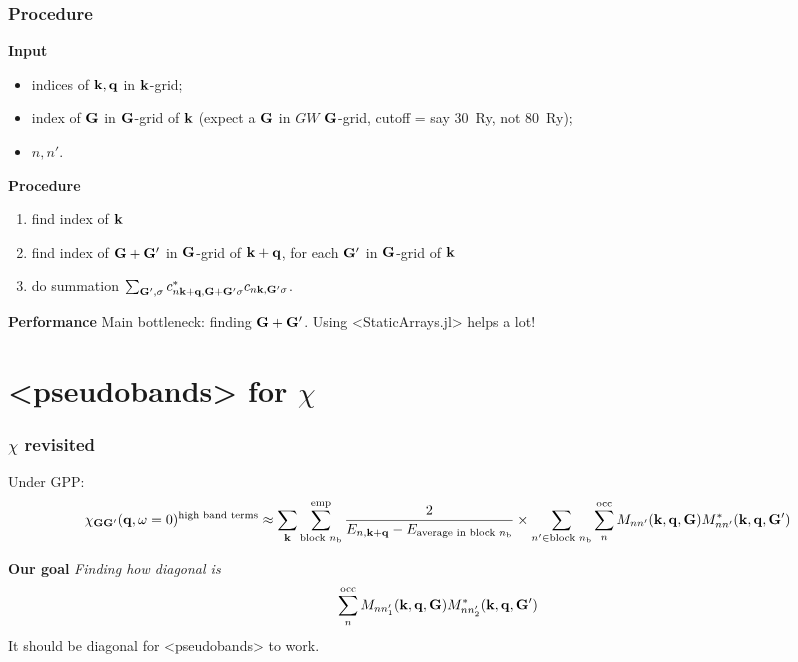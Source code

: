 \documentclass[t,aspectratio=169]{beamer}
\newcommand{\shortcode}[1]{\texttt{#1}}
\def\\{}%
\def\texttt#1{<#1>}%
\begin{document}
\begin{frame}
\frametitle{Procedure}

\textbf{Input} 
\begin{itemize}
    \item indices of $\vb{k}, \vb{q}$ in $\vb{k}$-grid; 
    \item index of $\vb{G}$ in $\vb{G}$-grid of $\vb{k}$ 
    (expect a $\vb{G}$ in $GW$ $\vb{G}$-grid, 
    cutoff = say \SI{30}{Ry}, not \SI{80}{Ry});
    \item $n, n'$.
\end{itemize}

\textbf{Procedure}
\begin{enumerate}
    \item find index of $\vb{k}$
    \item find index of $\vb{G} + \vb{G}'$ in $\vb{G}$-grid of $\vb{k} + \vb{q}$,
    for each $\vb{G}'$ in $\vb{G}$-grid of $\vb{k}$
    \item do summation $\sum_{\vb{G}', \sigma} c^*_{n \vb{k} + \vb{q}, \vb{G} + \vb{G}' \sigma} c_{n \vb{k}, \vb{G}' \sigma}$.
\end{enumerate}    

\vspace{0.3cm}

\textbf{Performance} Main bottleneck: finding $\vb{G} + \vb{G}'$.
Using \shortcode{StaticArrays.jl} helps a lot! 

\end{frame}

\section{\shortcode{pseudobands} for $\chi$}

\begin{frame}
\frametitle{$\chi$ revisited}

Under GPP:
\begin{equation*}
    \begin{aligned}
        \chi_{\vb{G} \vb{G}'}(\vb{q}, \omega=0)^{\text{high band terms}}
        \approx \sum_{\vb{k}} \sum_{\text{block $n_{\text{b}}$}}^{\text{emp}} 
        \frac{
            2
        }{
            E_{n, \vb{k} + \vb{q}} - E_{\text{average in block $n_{\text{b}}$}} 
        } \\
        \times \sum_{n' \in \text{block $n_{\text{b}}$}} \sum_{n}^{\text{occ}} 
        M_{n n'} (\vb{k}, \vb{q}, \vb{G}) M^*_{nn'} (\vb{k}, \vb{q}, \vb{G}') 
    \end{aligned}
\end{equation*}

\vspace{0.5cm}

\textbf{Our goal} \emph{Finding how diagonal is}
\begin{equation*}
    \sum_{n}^{\text{occ}} 
        M_{n n'_1} (\vb{k}, \vb{q}, \vb{G}) M^*_{nn'_2} (\vb{k}, \vb{q}, \vb{G}') 
\end{equation*}
It should be diagonal for \shortcode{pseudobands} to work.

\end{frame}
\end{document}
